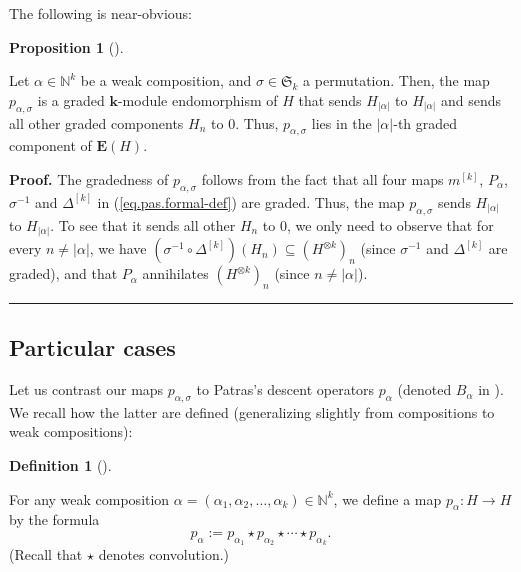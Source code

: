 \documentclass[numbers=enddot,12pt,final,onecolumn,notitlepage]{scrartcl}%
\theoremstyle{definition}
\newtheorem{prop}[theo]{Proposition}
\newenvironment{proposition}[1][]
{\begin{prop}[#1]\begin{leftbar}}
{\end{leftbar}\end{prop}}
\newtheorem{defi}[theo]{Definition}
\newenvironment{definition}[1][]
{\begin{defi}[#1]\begin{leftbar}}
{\end{leftbar}\end{defi}}
\newenvironment{proof}[1][Proof]{\noindent\textbf{#1.} }{\ \rule{0.5em}{0.5em}}
\begin{document}
The following is near-obvious:

\begin{proposition}
\label{prop.pas.graded}Let $\alpha\in\mathbb{N}^{k}$ be a weak composition,
and $\sigma\in\mathfrak{S}_{k}$ a permutation. Then, the map $p_{\alpha
,\sigma}$ is a graded $\mathbf{k}$-module endomorphism of $H$ that sends
$H_{\left\vert \alpha\right\vert }$ to $H_{\left\vert \alpha\right\vert }$ and
sends all other graded components $H_{n}$ to $0$. Thus, $p_{\alpha,\sigma}$
lies in the $\left\vert \alpha\right\vert $-th graded component of
$\mathbf{E}\left(  H\right)  $.
\end{proposition}

\begin{proof}
The gradedness of $p_{\alpha,\sigma}$ follows from the fact that all four maps
$m^{\left[  k\right]  }$, $P_{\alpha}$, $\sigma^{-1}$ and $\Delta^{\left[
k\right]  }$ in (\ref{eq.pas.formal-def}) are graded. Thus, the map
$p_{\alpha,\sigma}$ sends $H_{\left\vert \alpha\right\vert }$ to
$H_{\left\vert \alpha\right\vert }$. To see that it sends all other $H_{n}$ to
$0$, we only need to observe that for every $n\neq\left\vert \alpha\right\vert
$, we have $\left(  \sigma^{-1}\circ\Delta^{\left[  k\right]  }\right)
\left(  H_{n}\right)  \subseteq\left(  H^{\otimes k}\right)  _{n}$ (since
$\sigma^{-1}$ and $\Delta^{\left[  k\right]  }$ are graded), and that
$P_{\alpha}$ annihilates $\left(  H^{\otimes k}\right)  _{n}$ (since
$n\neq\left\vert \alpha\right\vert $).
\end{proof}

\subsection{Particular cases}

Let us contrast our maps $p_{\alpha,\sigma}$ to Patras's descent operators
$p_{\alpha}$ (denoted $B_{\alpha}$ in \cite[\S II]{Patras94}). We recall how
the latter are defined (generalizing slightly from compositions to weak compositions):

\begin{definition}
\label{def.pa}For any weak composition $\alpha=\left(  \alpha_{1},\alpha
_{2},\ldots,\alpha_{k}\right)  \in\mathbb{N}^{k}$, we define a map $p_{\alpha
}:H\rightarrow H$ by the formula%
\[
p_{\alpha}:=p_{\alpha_{1}}\star p_{\alpha_{2}}\star\cdots\star p_{\alpha_{k}%
}.
\]
(Recall that $\star$ denotes convolution.)
\end{definition}
\end{document}
